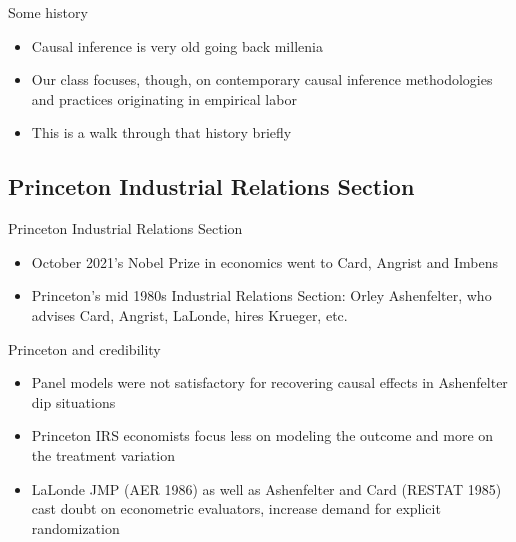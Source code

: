 \documentclass{beamer}
\begin{document}
\begin{frame}{Some history}

  \begin{itemize}
    \item Causal inference is very old going back millenia
    \item Our class focuses, though, on contemporary causal inference methodologies and practices originating in empirical labor
    \item This is a walk through that history briefly
  \end{itemize}

\end{frame}

\subsection{Princeton Industrial Relations Section}


\begin{frame}{Princeton Industrial Relations Section}

  \begin{itemize}
    \item October 2021's Nobel Prize in economics went to Card, Angrist and Imbens
    \item Princeton's mid 1980s Industrial Relations Section: Orley Ashenfelter, who advises Card, Angrist, LaLonde, hires Krueger, etc.
  \end{itemize}

\end{frame}

\begin{frame}{Princeton and credibility}

  \begin{itemize}
    \item Panel models were not satisfactory for recovering causal effects in Ashenfelter dip situations
    \item Princeton IRS economists focus less on modeling the outcome and more on the treatment variation
    \item LaLonde JMP (AER 1986) as well as Ashenfelter and Card (RESTAT 1985) cast doubt on econometric evaluators, increase demand for explicit randomization
  \end{itemize}

\end{frame}
\end{document}
